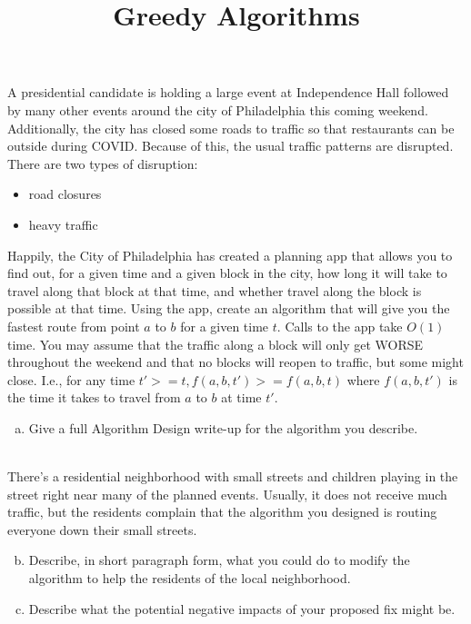 \documentclass[12pt]{amsart}
\title{Greedy Algorithms}
\date{} %
\begin{document}
\maketitle


A presidential candidate is holding a large event at Independence Hall followed by many other events around the city of Philadelphia this coming weekend.  Additionally, the city has closed some roads to traffic so that restaurants can be outside during COVID.  Because of this, the usual traffic patterns are disrupted.  There are two types of disruption:
\begin{itemize}
\item road closures
\item heavy traffic
\end{itemize}
Happily, the City of Philadelphia has created a planning app that allows you to find out, for a given time and a given block in the city, how long it will take to travel along that block at that time, and whether travel along the block is possible at that time.  Using the app, create an algorithm that will give you the fastest route from point $a$ to $b$ for a given time $t$.  Calls to the app take $O(1)$ time.  You may assume that the traffic along a block will only get WORSE throughout the weekend and that no blocks will reopen to traffic, but some might close.  I.e., for any time $t' >= t, f(a,b,t') >= f(a,b,t)$ where $f(a,b,t')$ is the time it takes to travel from $a$ to $b$ at time $t'$.
~\\

\begin{enumerate}[a)]
\item Give a full Algorithm Design write-up for the algorithm you describe.
\end{enumerate}
~\\

There's a residential neighborhood with small streets and children playing in the street right near many of the planned events.  Usually, it does not receive much traffic, but the residents complain that the algorithm you designed is routing everyone down their small streets.
~\\

\begin{enumerate}[a)]
\setcounter{enumi}{1}
\item Describe, in short paragraph form, what you could do to modify the algorithm to help the residents of the local neighborhood.
\item Describe what the potential negative impacts of your proposed fix might be.
\end{enumerate}
\end{document}
